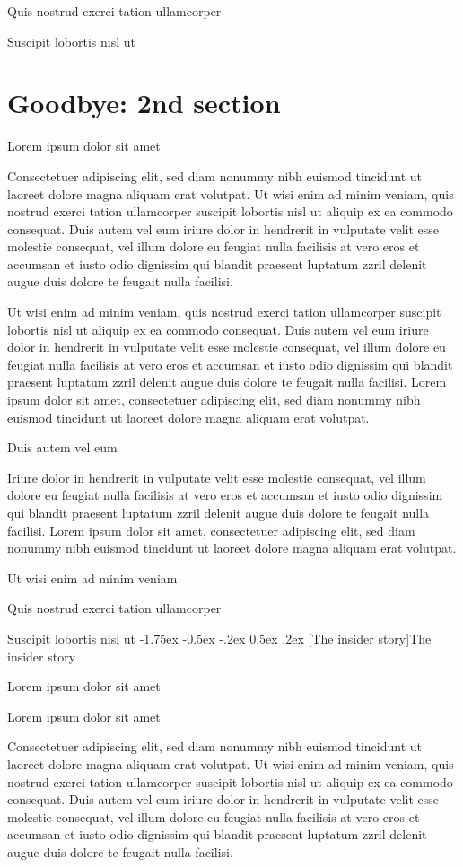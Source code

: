 \documentclass[11pt,twoside]{article}\makeatletter
\makeatletter
\renewcommand\section{\@startsection {section}{1}{\z@}%
     {-1.75ex \@plus -0.5ex \@minus -.2ex}%
     {0.5ex \@plus .2ex}%
     {\reset@font\Large\bfseries\sffamily}}
\renewcommand\subsection{\@startsection{subsection}{2}{\z@}%
     {-1.75ex\@plus -0.5ex \@minus- .2ex}%
     {0.5ex \@plus .2ex}%
     {\reset@font\Large\sffamily}}
\def\DivI{\section}
\def\DivII{\subsection}
\def\DivI{\chapter}
\def\DivII{\section}
\makeatother
\begin{document}
Quis nostrud exerci tation ullamcorper \par
Suscipit lobortis nisl ut 
\DivI[Goodbye: 2nd section]{Goodbye: 2nd section}\label{part2}\par
Lorem ipsum dolor sit amet\par
Consectetuer adipiscing elit, sed diam nonummy nibh euismod       tincidunt ut laoreet dolore magna aliquam erat volutpat. Ut wisi enim       ad minim veniam, quis nostrud exerci tation ullamcorper suscipit       lobortis nisl ut aliquip ex ea commodo consequat. Duis autem vel eum       iriure dolor in hendrerit in vulputate velit esse molestie consequat,       vel illum dolore eu feugiat nulla facilisis at vero eros et accumsan       et iusto odio dignissim qui blandit praesent luptatum zzril delenit       augue duis dolore te feugait nulla facilisi.\par
Ut wisi enim ad minim veniam, quis nostrud exerci tation       ullamcorper suscipit lobortis nisl ut aliquip ex ea commodo       consequat. Duis autem vel eum iriure dolor in hendrerit in vulputate       velit esse molestie consequat, vel illum dolore eu feugiat nulla       facilisis at vero eros et accumsan et iusto odio dignissim qui blandit       praesent luptatum zzril delenit augue duis dolore te feugait nulla       facilisi. Lorem ipsum dolor sit amet, consectetuer adipiscing elit,       sed diam nonummy nibh euismod tincidunt ut laoreet dolore magna       aliquam erat volutpat. \par
Duis autem vel eum \par
Iriure dolor in hendrerit in vulputate velit esse molestie       consequat, vel illum dolore eu feugiat nulla facilisis at vero eros et       accumsan et iusto odio dignissim qui blandit praesent luptatum zzril       delenit augue duis dolore te feugait nulla facilisi. Lorem ipsum dolor       sit amet, consectetuer adipiscing elit, sed diam nonummy nibh euismod       tincidunt ut laoreet dolore magna aliquam erat volutpat. \par
Ut wisi enim ad minim veniam\par
Quis nostrud exerci tation ullamcorper \par
Suscipit lobortis nisl ut 
\DivII[The insider story]{The insider story}\label{part2.1}\par
Lorem ipsum dolor sit amet\par
Lorem ipsum dolor sit amet\par
Consectetuer adipiscing elit, sed diam nonummy nibh euismod       tincidunt ut laoreet dolore magna aliquam erat volutpat. Ut wisi enim       ad minim veniam, quis nostrud exerci tation ullamcorper suscipit       lobortis nisl ut aliquip ex ea commodo consequat. Duis autem vel eum       iriure dolor in hendrerit in vulputate velit esse molestie consequat,       vel illum dolore eu feugiat nulla facilisis at vero eros et accumsan       et iusto odio dignissim qui blandit praesent luptatum zzril delenit       augue duis dolore te feugait nulla facilisi.\par
\end{document}
